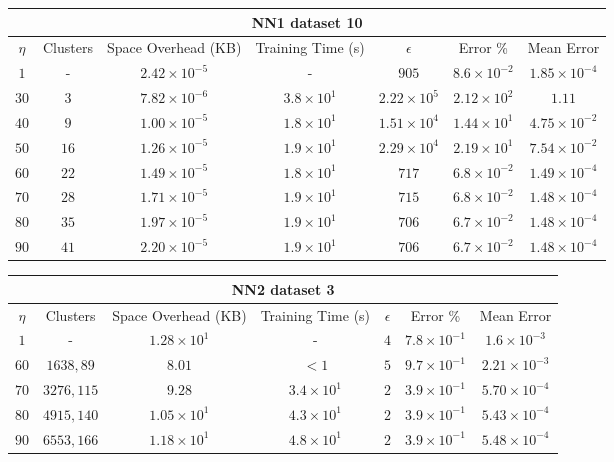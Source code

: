 \begin{adjustwidth}{-1cm}{}
\begin{tabular}{ccccccc}
\hline
\multicolumn{7}{c}{NN1 dataset 10} \\
\toprule
$\eta$ & Clusters & Space Overhead (KB) & Training Time (s) & $\epsilon$ & Error \% & Mean Error\\
\midrule
$1$ & - & $2.42 \times 10^{-5}$ & - & $905$ & $8.6 \times 10^{-2}$ & $1.85 \times 10^{-4}$\\
$30$ & $3$ & $7.82 \times 10^{-6}$ & $3.8 \times 10^1$ & $2.22 \times 10^5$ & $2.12 \times 10^2$ & $1.11$\\
$40$ & $9$ & $1.00 \times 10^{-5}$ & $1.8 \times 10^1$ & $1.51 \times 10^4$ & $1.44 \times 10^1$ & $4.75 \times 10^{-2}$\\
$50$ & $16$ & $1.26 \times 10^{-5}$ & $1.9 \times 10^1$ & $2.29 \times 10^4$ & $2.19 \times 10^1$ & $7.54 \times 10^{-2}$\\
$60$ & $22$ & $1.49 \times 10^{-5}$ & $1.8 \times 10^1$ & $717$ & $6.8 \times 10^{-2}$ & $1.49 \times 10^{-4}$\\
$70$ & $28$ & $1.71 \times 10^{-5}$ & $1.9 \times 10^1$ & $715$ & $6.8 \times 10^{-2}$ & $1.48 \times 10^{-4}$\\
$80$ & $35$ & $1.97 \times 10^{-5}$ & $1.9 \times 10^1$ & $706$ & $6.7 \times 10^{-2}$ & $1.48 \times 10^{-4}$\\
$90$ & $41$ & $2.20 \times 10^{-5}$ & $1.9 \times 10^1$ & $706$ & $6.7 \times 10^{-2}$ & $1.48 \times 10^{-4}$\\
\bottomrule
\end{tabular}
\end{adjustwidth}

\par\null\par
\par\null\par

\begin{adjustwidth}{-1cm}{}
\begin{tabular}{ccccccc}
\hline
\multicolumn{7}{c}{NN2 dataset 3} \\
\toprule
$\eta$ & Clusters & Space Overhead (KB) & Training Time (s) & $\epsilon$ & Error \% & Mean Error\\
\midrule
$1$ & - & $1.28 \times 10^{1}$ & - & $4$ & $7.8 \times 10^{-1}$ & $1.6 \times 10^{-3}$\\
$60$ & $1638, 89$ & $8.01$ & $<1$ & $5$ & $9.7 \times 10^{-1}$ & $2.21 \times 10^{-3}$\\
$70$ & $3276, 115$ & $9.28$ & $3.4 \times 10^1$ & $2$ & $3.9 \times 10^{-1}$ & $5.70 \times 10^{-4}$\\
$80$ & $4915, 140$ & $1.05 \times 10^1$ & $4.3 \times 10^1$ & $2$ & $3.9 \times 10^{-1}$ & $5.43 \times 10^{-4}$\\
$90$ & $6553, 166$ & $1.18 \times 10^1$ & $4.8 \times 10^1$ & $2$ & $3.9 \times 10^{-1}$ & $5.48 \times 10^{-4}$\\
\bottomrule
\end{tabular}
\end{adjustwidth}

